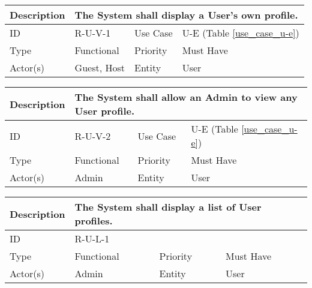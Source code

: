 \begin{tabular}{|p{1.5cm}|p{1.5cm}|p{1.5cm}|p{1.5cm}|p{1.5cm}|p{1.5cm}|p{1.5cm}|p{1.5cm}|p{1.5cm}|p{1.5cm}|p{1.5cm}|p{1.5cm}|}
    \hline
    \multicolumn{2}{|o|}{Description} & \multicolumn{10}{p{12.5cm}|}{The System shall display a User's own profile.} \\ \hline
    \multicolumn{2}{|o|}{ID}          & \multicolumn{4}{n}{R-U-V-1}            & \multicolumn{2}{|o|}{Use Case}    & \multicolumn{4}{n|}{U-E (Table \ref{use_case_u-e})} \\ \hline
    \multicolumn{2}{|o|}{Type}        & \multicolumn{4}{n}{Functional}         & \multicolumn{2}{|o|}{Priority}    & \multicolumn{4}{n|}{Must Have}  \\ \hline
    \multicolumn{2}{|o|}{Actor(s)}    & \multicolumn{4}{n}{Guest, Host}        & \multicolumn{2}{|o|}{Entity}      & \multicolumn{4}{n|}{User} \\ \hline
\end{tabular}

\begin{tabular}{|p{1.5cm}|p{1.5cm}|p{1.5cm}|p{1.5cm}|p{1.5cm}|p{1.5cm}|p{1.5cm}|p{1.5cm}|p{1.5cm}|p{1.5cm}|p{1.5cm}|p{1.5cm}|}
    \hline
    \multicolumn{2}{|o|}{Description} & \multicolumn{10}{p{12.5cm}|}{The System shall allow an Admin to view any User profile.} \\ \hline
    \multicolumn{2}{|o|}{ID}          & \multicolumn{4}{n}{R-U-V-2}            & \multicolumn{2}{|o|}{Use Case}    & \multicolumn{4}{n|}{U-E (Table \ref{use_case_u-e})} \\ \hline
    \multicolumn{2}{|o|}{Type}        & \multicolumn{4}{n}{Functional}         & \multicolumn{2}{|o|}{Priority}    & \multicolumn{4}{n|}{Must Have}  \\ \hline
    \multicolumn{2}{|o|}{Actor(s)}    & \multicolumn{4}{n}{Admin}              & \multicolumn{2}{|o|}{Entity}      & \multicolumn{4}{n|}{User} \\ \hline
\end{tabular}

\begin{tabular}{|p{1.5cm}|p{1.5cm}|p{1.5cm}|p{1.5cm}|p{1.5cm}|p{1.5cm}|p{1.5cm}|p{1.5cm}|p{1.5cm}|p{1.5cm}|p{1.5cm}|p{1.5cm}|}
    \hline
    \multicolumn{2}{|o|}{Description} & \multicolumn{10}{p{12.5cm}|}{The System shall display a list of User profiles.} \\ \hline
    \multicolumn{2}{|o|}{ID}          & \multicolumn{10}{p{12.5cm}|}{R-U-L-1}  \\ \hline
    \multicolumn{2}{|o|}{Type}        & \multicolumn{4}{n}{Functional}         & \multicolumn{2}{|o|}{Priority}    & \multicolumn{4}{n|}{Must Have}  \\ \hline
    \multicolumn{2}{|o|}{Actor(s)}    & \multicolumn{4}{n}{Admin}              & \multicolumn{2}{|o|}{Entity}      & \multicolumn{4}{n|}{User} \\ \hline
\end{tabular}

